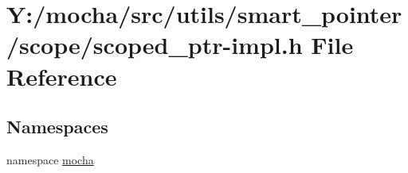 \hypertarget{scoped__ptr-impl_8h}{
\section{Y:/mocha/src/utils/smart\_\-pointer/scope/scoped\_\-ptr-\/impl.h File Reference}
\label{scoped__ptr-impl_8h}
}
\subsection*{Namespaces}
\begin{DoxyCompactItemize}
\item 
namespace \hyperlink{namespacemocha}{mocha}
\end{DoxyCompactItemize}
